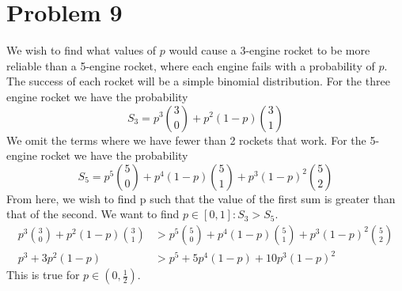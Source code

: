 \documentclass{article}
\begin{document}
\section*{Problem 9}
We wish to find what values of $p$ would cause a 3-engine rocket to be more reliable than a
5-engine rocket, where each engine fails with a probability of $p$.
The success of each rocket will be a simple binomial distribution.
For the three engine rocket we have the probability 
\[ S_3 = p^3 {3 \choose 0} + p^2(1-p) {3 \choose 1} \]
We omit the terms where we have fewer than 2 rockets that work.
For the 5-engine rocket we have the probability 
\[ S_5 = p^5 {5 \choose 0} + p^4(1-p) {5 \choose 1} + p^3(1-p)^2 {5 \choose 2} \]
From here, we wish to find p such that the value of the first sum is greater than that of the second.
We want to find $p \in [0,1] : S_3 > S_5$.
\begin{align*}
    p^3 {3 \choose 0} + p^2(1-p) {3 \choose 1} & > p^5 {5 \choose 0} + p^4(1-p) {5 \choose 1} + p^3(1-p)^2 {5 \choose 2}\\
    p^3 + 3 p^2 (1-p) & > p^5 + 5 p^4 (1-p) + 10 p^3 (1-p)^2
\end{align*} 
This is true for $p \in (0, \frac{1}{2})$.
\end{document}
